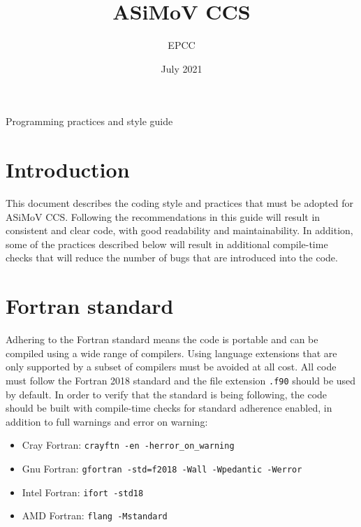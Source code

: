 \documentclass[11pt]{article}
\begin{document}
\lstset{style=codefragment}


\title{ASiMoV CCS}

\date{July 2021}
\author{EPCC}

\makeEPCCtitle

\centerline{\sc Programming practices and style guide}

\tableofcontents
\pagebreak

\bigskip


\bigskip


\section{Introduction}
This document describes the coding style and practices that must be adopted for ASiMoV CCS. Following the recommendations
in this guide will result in consistent and clear code, with good readability and maintainability. In addition, 
some of the practices described below will result in additional compile-time checks that will reduce the number of 
bugs that are introduced into the code.

\section{Fortran standard}
Adhering to the Fortran standard means the code is portable and can be compiled using a wide range of compilers. 
Using language extensions that are only supported by a subset of compilers must be avoided at all cost. All code 
must follow the Fortran 2018 standard and the file extension \texttt{.f90} should be used by default. In order to 
verify that the standard is being following, the code should be built with compile-time checks for standard 
adherence enabled, in addition to full warnings and error on warning:
\begin{itemize}
\item Cray Fortran: \texttt{crayftn -en -herror\_on\_warning}
\item Gnu Fortran: \texttt{gfortran -std=f2018 -Wall -Wpedantic -Werror}
\item Intel Fortran: \texttt{ifort -std18}
\item AMD Fortran: \texttt{flang -Mstandard}
\end{itemize}
\end{document}
